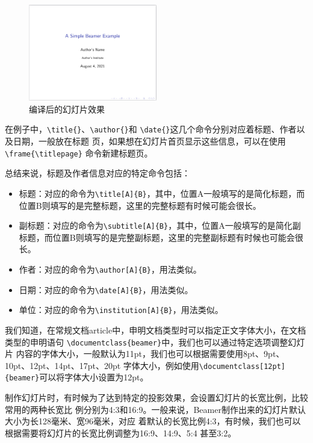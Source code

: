 \begin{figure}[htbp]
    \centering
    \includegraphics[width = 0.5\textwidth]{images/ch_9/example1.png}
    \caption{编译后的幻灯片效果}
    \label{fig:901}
\end{figure}


在例子中，\texttt{\textbackslash{}title\{\}}、\texttt{\textbackslash{}author\{\}}和
\texttt{\textbackslash{}date\{\}}这几个命令分别对应着标题、作者以及日期，一般放在标题
页，如果想在幻灯片首页显示这些信息，可以在使用\texttt{\textbackslash{}frame\{\textbackslash{}titlepage\}}
命令新建标题页。

总结来说，标题及作者信息对应的特定命令包括：
\begin{itemize}
    \item 标题：对应的命令为\texttt{\textbackslash{}title[A]\{B\}}，其中，位置A一般填写的是简化标题，而位置B则填写的是完整标题，这里的完整标题有时候可能会很长。
    \item 副标题：对应的命令为\texttt{\textbackslash{}subtitle[A]\{B\}}，其中，位置A一般填写的是简化副标题，而位置B则填写的是完整副标题，这里的完整副标题有时候也可能会很长。
    \item 作者：对应的命令为\texttt{\textbackslash{}author[A]\{B\}}，用法类似。
    \item 日期：对应的命令为\texttt{\textbackslash{}date[A]\{B\}}，用法类似。
    \item 单位：对应的命令为\texttt{\textbackslash{}institution[A]\{B\}}，用法类似。
\end{itemize}

我们知道，在常规文档article中，申明文档类型时可以指定正文字体大小，在文档类型的申明语句
\texttt{\textbackslash{}documentclass\{beamer\}}中，我们也可以通过特定选项调整幻灯片
内容的字体大小，一般默认为11pt，我们也可以根据需要使用8pt、9pt、10pt、12pt、14pt、17pt、20pt
字体大小，例如使用\texttt{\textbackslash{}documentclass[12pt]\{beamer\}}可以将字体大小设置为12pt。

制作幻灯片时，有时候为了达到特定的投影效果，会设置幻灯片的长宽比例，比较常用的两种长宽比
例分别为4:3和16:9。一般来说，Beamer制作出来的幻灯片默认大小为长128毫米、宽96毫米，对应
着默认的长宽比例4:3，有时候，我们也可以根据需要将幻灯片的长宽比例调整为16:9、14:9、5:4
甚至3:2。

